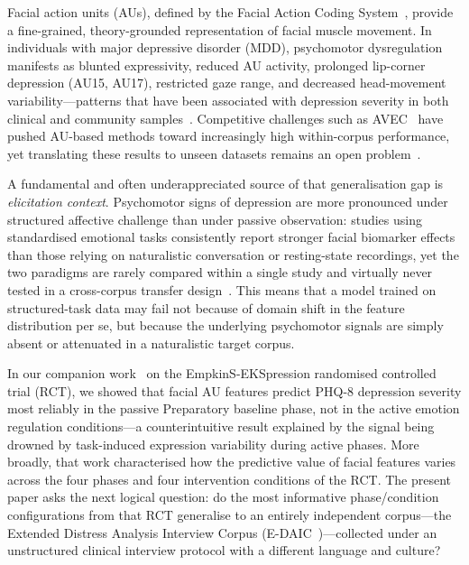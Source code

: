 \documentclass[sigconf]{acmart}
\begin{document}
Facial action units (AUs), defined by the Facial Action Coding System~\cite{ekman1978},
provide a fine-grained, theory-grounded representation of facial muscle movement.
In individuals with major depressive disorder (MDD), psychomotor dysregulation manifests
as blunted expressivity, reduced AU activity, prolonged lip-corner depression (AU15,
AU17), restricted gaze range, and decreased head-movement variability---patterns that
have been associated with depression severity in both clinical and community
samples~\cite{girard2014,jain2014depression,SchullerRingeval2015}. Competitive challenges
such as AVEC~\cite{ringeval2019avec} have pushed AU-based methods toward increasingly
high within-corpus performance, yet translating these results to unseen datasets remains
an open problem~\cite{cummins2015review,jaiswal2019mismatch}.

A fundamental and often underappreciated source of that generalisation gap is
\emph{elicitation context}. Psychomotor signs of depression are more pronounced
under structured affective challenge than under passive observation: studies using
standardised emotional tasks consistently report stronger facial biomarker effects
than those relying on naturalistic conversation or resting-state recordings, yet the
two paradigms are rarely compared within a single study and virtually never tested in
a cross-corpus transfer design~\cite{alghowinem2016multimodal,cummins2015review}.
This means that a model trained on structured-task data may fail not because of
domain shift in the feature distribution per se, but because the underlying
psychomotor signals are simply absent or attenuated in a naturalistic target corpus.

In our companion work~\cite{empkins_journal} on the EmpkinS-EKSpression randomised
controlled trial (RCT), we showed that facial AU features predict PHQ-8 depression
severity most reliably in the passive Preparatory baseline phase, not in the active
emotion regulation conditions---a counterintuitive result explained by the signal
being drowned by task-induced expression variability during active phases.
More broadly, that work characterised how the predictive value of facial features
varies across the four phases and four intervention conditions of the RCT.
The present paper asks the next logical question: do the most informative
phase/condition configurations from that RCT generalise to an entirely
independent corpus---the Extended Distress Analysis Interview Corpus
(E-DAIC~\cite{gratch2014edaic})---collected under an unstructured clinical
interview protocol with a different language and culture?
\end{document}
